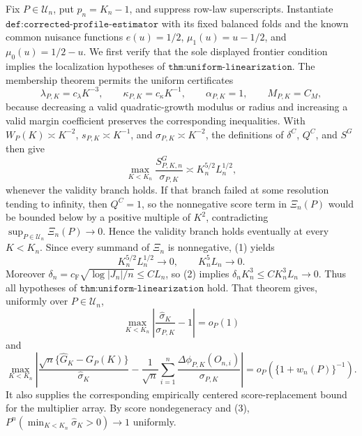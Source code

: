Fix \(P\in\mathcal U_n\), put \(p_n=K_n-1\), and suppress row-law superscripts.  Instantiate \(\texttt{def:corrected-profile-estimator}\) with its fixed balanced folds and the known common nuisance functions \(e(u)=1/2\), \(\mu_1(u)=u-1/2\), and \(\mu_0(u)=1/2-u\).  We first verify that the sole displayed frontier condition implies the localization hypotheses of \(\texttt{thm:uniform-linearization}\).  The membership theorem permits the uniform certificates
\[
 \lambda_{P,K}=c_\lambda K^{-3},\qquad \kappa_{P,K}=c_\kappa K^{-1},
 \qquad \alpha_{P,K}=1,\qquad M_{P,K}=C_M,
\]
because decreasing a valid quadratic-growth modulus or radius and increasing a valid margin coefficient preserves the corresponding inequalities.  With \(W_P(K)\asymp K^{-2}\), \(s_{P,K}\asymp K^{-1}\), and \(\sigma_{P,K}\asymp K^{-2}\), the definitions of \(\delta^C\), \(Q^C\), and \(S^G\) then give
\[
 \max_{K<K_n}\frac{S^G_{P,K,n}}{\sigma_{P,K}}\asymp K_n^{5/2}L_n^{1/2},     \tag{1}
\]
whenever the validity branch holds.  If that branch failed at some resolution tending to infinity, then \(Q^C=1\), so the nonnegative score term in \(\Xi_n(P)\) would be bounded below by a positive multiple of \(K^2\), contradicting \(\sup_{P\in\mathcal U_n}\Xi_n(P)\to0\).  Hence the validity branch holds eventually at every \(K<K_n\).  Since every summand of \(\Xi_n\) is nonnegative, (1) yields
\[
 K_n^{5/2}L_n^{1/2}\longrightarrow0,\qquad K_n^5L_n\longrightarrow0.        \tag{2}
\]
Moreover \(\delta_n=c_{\mathrm F}\sqrt{\log|J_n|/n}\leq C L_n\), so (2) implies \(\delta_nK_n^3\leq CK_n^3L_n\to0\).  Thus all hypotheses of \(\texttt{thm:uniform-linearization}\) hold.  That theorem gives, uniformly over \(P\in\mathcal U_n\),
\[
 \max_{K<K_n}\left|\frac{\widehat\sigma_K}{\sigma_{P,K}}-1\right|=o_P(1)  \tag{3}
\]
and
\[
 \max_{K<K_n}\left|
 \frac{\sqrt n\{\widehat G_K-G_P(K)\}}{\widehat\sigma_K}
 -\frac1{\sqrt n}\sum_{i=1}^n
 \frac{\Delta\phi_{P,K}(O_{n,i})}{\sigma_{P,K}}
 \right|=o_P\!\left(\{1+w_n(P)\}^{-1}\right).                              \tag{4}
\]
It also supplies the corresponding empirically centered score-replacement bound for the multiplier array.  By score nondegeneracy and (3), \(P^n(\min_{K<K_n}\widehat\sigma_K>0)\to1\) uniformly.

